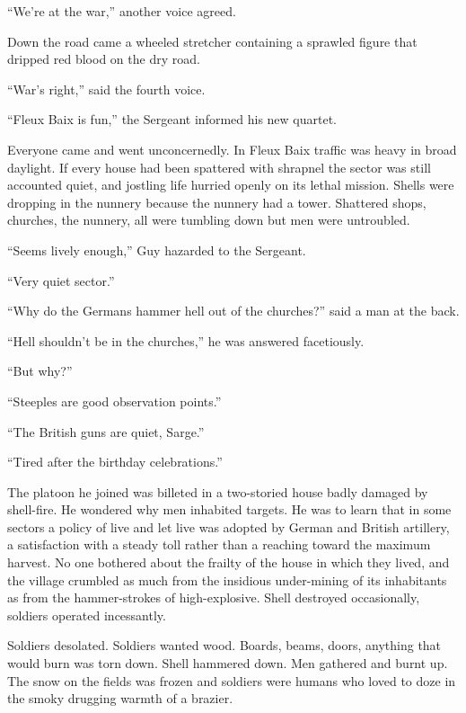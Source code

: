``We're at the war,'' another voice agreed.

Down the road came a wheeled stretcher containing a sprawled figure that dripped red blood on 
the dry road.

``War's right,'' said the fourth voice.

``Fleux Baix is fun,'' the Sergeant informed his new quartet.

Everyone came and went unconcernedly. In Fleux Baix traffic was heavy in broad daylight. 
If every house had been spattered with shrapnel the sector was still accounted quiet, and 
jostling life hurried openly on its lethal mission. Shells were dropping in the nunnery 
because the nunnery had a tower. Shattered shops, churches, the nunnery, all were tumbling 
down but men were untroubled.

``Seems lively enough,'' Guy hazarded to the Sergeant.

``Very quiet sector.''

``Why do the Germans hammer hell out of the churches?'' said a man at the back.

``Hell shouldn't be in the churches,'' he was answered facetiously.

``But why?''

``Steeples are good observation points.''

``The British guns are quiet, Sarge.''

``Tired after the birthday celebrations.''

The platoon he joined was billeted in a two-storied house badly damaged by shell-fire. 
He wondered why men inhabited targets. He was to learn that in some sectors a policy of 
live and let live was adopted by German and British artillery, a satisfaction with a 
steady toll rather than a reaching toward the maximum harvest. No one bothered about 
the frailty of the house in which they lived, and the village crumbled as much from the 
insidious under-mining of its inhabitants as from the hammer-strokes of high-explosive. 
Shell destroyed occasionally, soldiers operated incessantly.

Soldiers desolated. Soldiers wanted wood. Boards, beams, doors, anything that would burn 
was torn down. Shell hammered down. Men gathered and burnt up. The snow on the fields was 
frozen and soldiers were humans who loved to doze in the smoky drugging warmth of a brazier.

